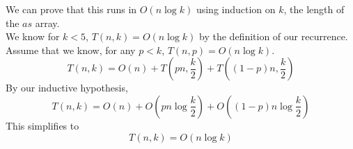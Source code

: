 \documentclass[11pt]{article}
\begin{document}
\begin{solution}
\begin{enumerate}
            We can prove that this runs in $O(n\log k)$ using induction on $k$, the length of the $as$ array. \\
            We know for $k < 5$, $T(n, k) = O(n\log k)$ by the definition of our recurrence. \\
            Assume that we know, for any $p < k$, $T(n, p) = O(n\log k)$. 
            \[
                T(n, k) = O(n) + T\left(pn, \frac{k}{2}\right) + T\left((1 - p)n, \frac{k}{2}\right)
            \]
            By our inductive hypothesis, 
            \[
                T(n, k) = O(n) + O\left(pn\log\frac{k}{2}\right) + O\left((1 - p)n\log\frac{k}{2}\right)
            \]
            This simplifies to 
            \[
                T(n, k) = O\left(n\log k\right)
            \]

    \end{enumerate}
\end{solution}
\end{document}
